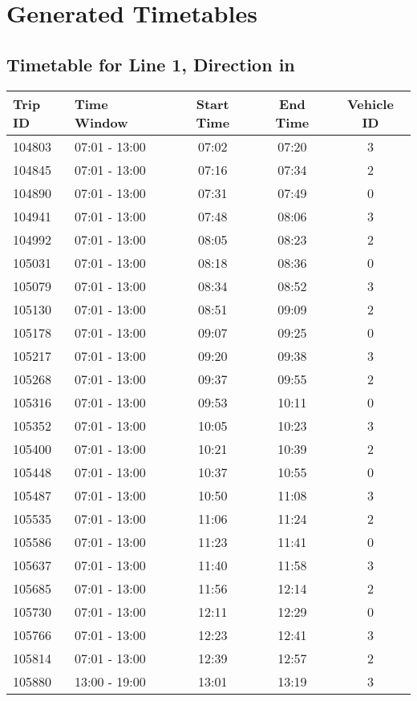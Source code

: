 \documentclass{article}
\begin{document}
            \section*{Generated Timetables}
            \subsection*{Timetable for Line 1, Direction in}
\begin{tabular}{llccc}
\toprule
Trip ID & Time Window & Start Time & End Time & Vehicle ID \\
\midrule
104803 & 07:01 - 13:00 & 07:02 & 07:20 & 3 \\
104845 & 07:01 - 13:00 & 07:16 & 07:34 & 2 \\
104890 & 07:01 - 13:00 & 07:31 & 07:49 & 0 \\
104941 & 07:01 - 13:00 & 07:48 & 08:06 & 3 \\
104992 & 07:01 - 13:00 & 08:05 & 08:23 & 2 \\
105031 & 07:01 - 13:00 & 08:18 & 08:36 & 0 \\
105079 & 07:01 - 13:00 & 08:34 & 08:52 & 3 \\
105130 & 07:01 - 13:00 & 08:51 & 09:09 & 2 \\
105178 & 07:01 - 13:00 & 09:07 & 09:25 & 0 \\
105217 & 07:01 - 13:00 & 09:20 & 09:38 & 3 \\
105268 & 07:01 - 13:00 & 09:37 & 09:55 & 2 \\
105316 & 07:01 - 13:00 & 09:53 & 10:11 & 0 \\
105352 & 07:01 - 13:00 & 10:05 & 10:23 & 3 \\
105400 & 07:01 - 13:00 & 10:21 & 10:39 & 2 \\
105448 & 07:01 - 13:00 & 10:37 & 10:55 & 0 \\
105487 & 07:01 - 13:00 & 10:50 & 11:08 & 3 \\
105535 & 07:01 - 13:00 & 11:06 & 11:24 & 2 \\
105586 & 07:01 - 13:00 & 11:23 & 11:41 & 0 \\
105637 & 07:01 - 13:00 & 11:40 & 11:58 & 3 \\
105685 & 07:01 - 13:00 & 11:56 & 12:14 & 2 \\
105730 & 07:01 - 13:00 & 12:11 & 12:29 & 0 \\
105766 & 07:01 - 13:00 & 12:23 & 12:41 & 3 \\
105814 & 07:01 - 13:00 & 12:39 & 12:57 & 2 \\
105880 & 13:00 - 19:00 & 13:01 & 13:19 & 3 \\

\end{tabular}
\end{document}
